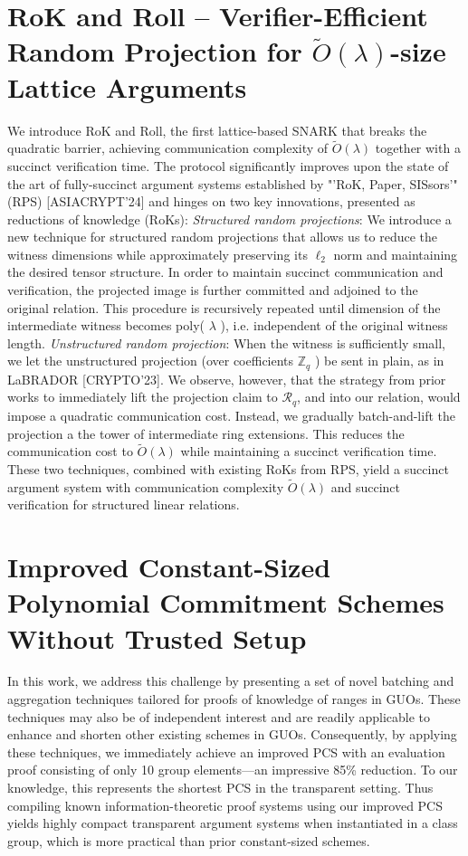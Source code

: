 \documentclass[11pt,oneside]{book}
\theoremstyle{definition}
\theoremstyle{remark}
\theoremstyle{plain}
\begin{document}
\section{\cite{cryptoeprint:2025/1220} {RoK} and Roll – Verifier-Efficient Random Projection for $\tilde{O}(\lambda)$-size Lattice Arguments}
We introduce RoK and Roll, the first lattice-based SNARK that breaks the quadratic barrier, achieving communication complexity of $\tilde{O}(\lambda)$ together with a succinct verification time. The protocol significantly improves upon the state of the art of fully-succinct argument systems established by "'RoK, Paper, SISsors'" (RPS) [ASIACRYPT'24] and hinges on two key innovations, presented as reductions of knowledge (RoKs): \emph{Structured random projections}: We introduce a new technique for structured random projections that allows us to reduce the witness dimensions while approximately preserving its $\ell_2$ norm and maintaining the desired tensor structure. In order to maintain succinct communication and verification, the projected image is further committed and adjoined to the original relation. This procedure is recursively repeated until dimension of the intermediate witness becomes poly( $\lambda$ ), i.e. independent of the original witness length. \emph{Unstructured random projection}: When the witness is sufficiently small, we let the unstructured projection (over coefficients $\mathbb{Z}_q$ ) be sent in plain, as in LaBRADOR [CRYPTO'23]. We observe, however, that the strategy from prior works to immediately lift the projection claim to $\mathcal{R}_q$, and into our relation, would impose a quadratic communication cost. Instead, we gradually batch-and-lift the projection a the tower of intermediate ring extensions. This reduces the communication cost to $\tilde{O}(\lambda)$ while maintaining a succinct verification time. These two techniques, combined with existing RoKs from RPS, yield a succinct argument system with communication complexity $\tilde{O}(\lambda)$ and succinct verification for structured linear relations.

\section{\cite{cryptoeprint:2025/1233} Improved Constant-Sized Polynomial Commitment Schemes Without Trusted Setup}
In this work, we address this challenge by presenting a set of novel batching and aggregation techniques tailored for proofs of knowledge of ranges in GUOs. These techniques may also be of independent interest and are readily applicable to enhance and shorten other existing schemes in GUOs. Consequently, by applying these techniques, we immediately achieve an improved PCS with an evaluation proof consisting of only 10 group elements---an impressive 85\% reduction. To our knowledge, this represents the shortest PCS in the transparent setting. Thus compiling known information-theoretic proof systems using our improved PCS yields highly compact transparent argument systems when instantiated in a class group, which is more practical than prior constant-sized schemes.
\end{document}
